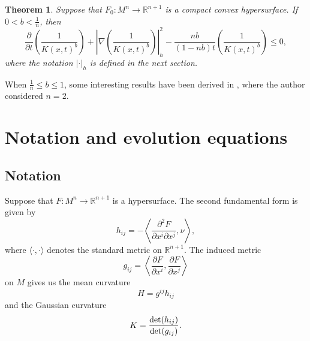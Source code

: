 \documentclass{amsart}
\newtheorem{theorem}{Theorem}[section]
\theoremstyle{definition}
\theoremstyle{remark}
\numberwithin{equation}{section}
\begin{document}
\begin{theorem} \label{t1.1}Suppose that $F_{0}: M^{n}\to\mathbb{R}^{n+1}$ is a compact convex hypersurface. If $0<b<\frac{1}{n}$, then
\begin{equation}
\frac{\partial}{\partial t}\left(\frac{1}{K(x,t)^{b}}\right)+\left|\nabla\left(\frac{1}{K(x,t)^{b}}\right)\right|^{2}_{h}
-\frac{nb}{(1-nb)t}\left(\frac{1}{K(x,t)^{b}}\right)\leq0,\label{1.2}
\end{equation}
where the notation $|\cdot|_{h}$ is defined in the next section.
\end{theorem}

When $\frac{1}{n}\leq b\leq1$, some interesting results have been derived 
in \cite{L}, where the author considered $n=2$.

\section{Notation and evolution equations}

\subsection{Notation}
Suppose that $F: M^{n}\to\mathbb{R}^{n+1}$ is a hypersurface. The second fundamental form is given by
\begin{equation}
h_{ij}=-\left\langle\frac{\partial^{2}F}{\partial x^{i}\partial x^{j}},\nu\right\rangle,\label{2.1}
\end{equation}
where $\langle\cdot,\cdot\rangle$ denotes the standard metric on $\mathbb{R}^{n+1}$.
The induced metric
\begin{equation}
g_{ij}=\left\langle\frac{\partial F}{\partial x^{i}},
\frac{\partial F}{\partial x^{j}}\right\rangle\label{2.2}
\end{equation}
on $M$ gives us the mean curvature
\begin{equation}
H=g^{ij}h_{ij}\label{2.3}
\end{equation}
and the Gaussian curvature
\begin{equation}
K=\frac{{\rm det}(h_{ij})}{{\rm det}(g_{ij})}.\label{2.4}
\end{equation}
\end{document}
